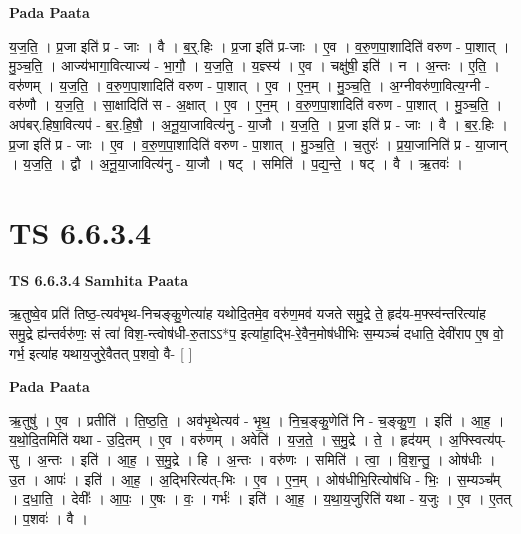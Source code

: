 \documentclass[17pt]{extarticle}
\begin{document}
\textbf{Pada Paata} \newline

य॒ज॒ति॒ । प्र॒जा इति॑ प्र - जाः । वै । ब॒र्॒.हिः । प्र॒जा इति॑ प्र-जाः । ए॒व । व॒रु॒ण॒पा॒शादिति॑ वरुण - पा॒शात् । मु॒ञ्च॒ति॒ । आज्य॑भागा॒वित्याज्य॑ - भा॒गौ॒ । य॒ज॒ति॒ । य॒ज्ञ्स्य॑ । ए॒व । चक्षु॑षी॒ इति॑ । न । अ॒न्तः । ए॒ति॒ । वरु॑णम् । य॒ज॒ति॒ । व॒रु॒ण॒पा॒शादिति॑ वरुण - पा॒शात् । ए॒व । ए॒न॒म् । मु॒ञ्च॒ति॒ । अ॒ग्नीवरु॑णा॒वित्य॒ग्नी - वरु॑णौ । य॒ज॒ति॒ । सा॒क्षादिति॑ स - अ॒क्षात् । ए॒व । ए॒न॒म् । व॒रु॒ण॒पा॒शादिति॑ वरुण - पा॒शात् । मु॒ञ्च॒ति॒ । अप॑बर्.हिषा॒वित्यप॑ - ब॒र॒.हि॒षौ॒ । अ॒नू॒या॒जावित्य॑नु - या॒जौ । य॒ज॒ति॒ । प्र॒जा इति॑ प्र - जाः । वै । ब॒र॒.हिः । प्र॒जा इति॑ प्र - जाः । ए॒व । व॒रु॒ण॒पा॒शादिति॑ वरुण - पा॒शात् । मु॒ञ्च॒ति॒ । च॒तुरः॑ । प्र॒या॒जानिति॑ प्र - या॒जान् । य॒ज॒ति॒ । द्वौ । अ॒नू॒या॒जावित्य॑नु - या॒जौ । षट् । समिति॑ । प॒द्य॒न्ते॒ । षट् । वै । ऋ॒तवः॑ ।  \newline




\section*{ TS 6.6.3.4 }

\textbf{TS 6.6.3.4 } \newline
\textbf{Samhita Paata} \newline

ऋ॒तुष्वे॒व प्रति॑ तिष्ठ॒-त्यव॑भृथ-निचङ्कु॒णेत्या॑ह यथोदि॒तमे॒व वरु॑ण॒मव॑ यजते समु॒द्रे ते॒ हृद॑य-म॒फ्स्व॑न्तरित्या॑ह समु॒द्रे ह्य॑न्तर्वरु॑णः॒ सं त्वा॑ विश॒-न्त्वोष॑धी-रु॒ताऽऽ*प॒ इत्या॑हा॒द्भि-रे॒वैन॒मोष॑धीभिः स॒म्यञ्चं॑ दधाति॒ देवी॑राप ए॒ष वो॒ गर्भ॒ इत्या॑ह यथाय॒जुरे॒वैतत् प॒शवो॒ वै- [  ] \newline

\textbf{Pada Paata} \newline

ऋ॒तुषु॑ । ए॒व । प्रतीति॑ । ति॒ष्ठ॒ति॒ । अव॑भृ॒थेत्यव॑ - भृ॒थ॒ । नि॒च॒ङ्कु॒णेति॑ नि - च॒ङ्कु॒ण॒ । इति॑ । आ॒ह॒ । य॒थो॒दि॒तमिति॑ यथा - उ॒दि॒तम् । ए॒व । वरु॑णम् । अवेति॑ । य॒ज॒ते॒ । स॒मु॒द्रे । ते॒ । हृद॑यम् । अ॒फ्स्वित्य॑प्-सु । अ॒न्तः । इति॑ । आ॒ह॒ । स॒मु॒द्रे । हि । अ॒न्तः । वरु॑णः । समिति॑ । त्वा॒ । वि॒श॒न्तु॒ । ओष॑धीः । उ॒त । आपः॑ । इति॑ । आ॒ह॒ । अ॒द्भिरित्य॑त्-भिः । ए॒व । ए॒न॒म् । ओष॑धीभि॒रित्योष॑धि - भिः॒ । स॒म्यञ्च᳚म् । द॒धा॒ति॒ । देवीः᳚ । आ॒पः॒ । ए॒षः । वः॒ । गर्भः॑ । इति॑ । आ॒ह॒ । य॒था॒य॒जुरिति॑ यथा - य॒जुः । ए॒व । ए॒तत् । प॒शवः॑ । वै ।  \newline
\end{document}
